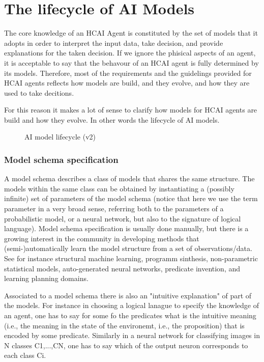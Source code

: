 \section{The lifecycle of AI Models}
The core knowledge of an HCAI Agent is constituted by the set of
models that it adopts in order to interpret the input data, take
decision, and provide explanations for the taken decision.  If we
ignore the phisical aspects of an agent, it is acceptable to say that
the behavour of an HCAI agent is fully determined by its models.
Therefore, most of the requirements and the guidelings provided for
HCAI agents reflects how models are build, and they evolve, and how
they are used to take decitions.

For this reason it makes a lot of sense to clarify how models for HCAI
agents are build and how they evolve. In other words the lifecycle of
AI models. 


\begin{figure}
    \centering
    
    \caption{AI model lifecycle (v2)}
    \label{fig:peterlifecycle}
\end{figure}

\subsubsection{Model schema specification}

A model schema describes a class of models that shares the same structure. The models within the same class can be obtained by instantiating a (possibly infinite) set of parameters of the model schema (notice that here we use the term parameter in a very broad sense, referring both to the parameters of a probabilistic model, or a neural network, but also to the signature of logical language). Model schema specification is usually done manually, but there is a growing interest in the community in developing methods that (semi-)automatically learn the model structure from a set of observations/data. See for instance structural machine learning, programm sinthesis, non-parametric statistical models, auto-generated neural networks, predicate invention, and learning planning domains.

Associated to a model schema there is also an "intuitive explanation" of part of the models. For instance in choosing a logical lanague to specify the knowledge of an agent, one has to say for some fo the predicates what is the intuitive meaning (i.e., the meaning in the state of the environemt, i.e., the proposition) that is encoded by some predicate. Similarly in a neural network for classifying images in N classes C1,...,CN, one has to say which of the output neuron corresponds to each class Ci.


